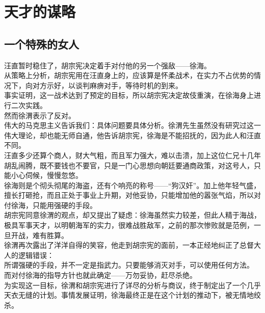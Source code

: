 \section{天才的谋略}
\ifnum{}
	\begin{multicols}{\theparacolNo}
\fi
\subsection{一个特殊的女人}
汪直暂时稳住了，胡宗宪决定着手对付他的另一个强敌——徐海。\\

从策略上分析，胡宗宪用在汪直身上的，应该算是怀柔战术，在实力不占优势的情况下，向对方示好，以谈判麻痹对手，等待时机的到来。\\

事实证明，这一战术达到了预定的目标，所以胡宗宪决定故伎重演，在徐海身上进行二次实践。\\

然而徐渭表示了反对。\\

伟大的马克思主义告诉我们：具体问题要具体分析。徐渭先生虽然没有研究过这一伟大理论，却也能无师自通，他告诉胡宗宪，徐海是不能招抚的，因为此人和汪直不同。\\

汪直多少还算个商人，财大气粗，而且军力强大，难以击溃，加上这位仁兄十几年胡乱闹腾，既不要钱也不要官，只是一门心思想向朝廷要通商政策，对这号人，只能小心伺候，慢慢忽悠。\\

徐海则是个彻头彻尾的海盗，还有个响亮的称号——“狗汉奸”。加上他年轻气盛，擅长打砸抢，而且正处于事业上升期，对他妥协，只能增加他的嚣张气焰，所以对付徐海，只能用强硬的手段。\\

胡宗宪同意徐渭的观点，却又提出了疑虑：徐海虽然实力较差，但此人精于海战，极具军事天才，以明朝海军的实力，很难战胜敌军，之前的那次惨败就是范例，一旦开战，难有胜算。\\

徐渭再次露出了洋洋自得的笑容，他走到胡宗宪的面前，一本正经地纠正了总督大人的逻辑错误：\\

所谓强硬的手段，并不一定是指武力。只要能够消灭对手，可以使用任何方法。\\

而对付徐海的指导方针也就此确定——万勿妥协，赶尽杀绝。\\

为实现这一目标，徐渭和胡宗宪进行了详尽的分析与商议，终于制定出了一个几乎天衣无缝的计划。事情发展证明，徐海最终正是在这个计划的推动下，被无情地绞杀。\\


\end{multicols}
